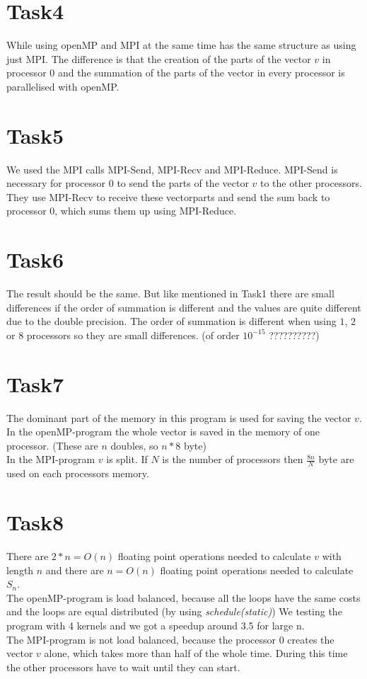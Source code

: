 \documentclass[11pt,titlepage] {article}
\begin{document}
\section{Task4}
While using openMP and MPI at the same time has the same structure as using just MPI. The difference is that the creation of the parts of the vector $v$ in processor $0$ and the summation of the parts of the vector in every processor is parallelised with openMP.

\section{Task5}
We used the MPI calls MPI-Send, MPI-Recv and MPI-Reduce.
MPI-Send is necessary for processor $0$ to send the parts of the vector $v$ to the other processors. They use MPI-Recv to receive these vectorparts and send the sum back to processor $0$, which sums them up using MPI-Reduce.

\section{Task6}
The result should be the same. But like mentioned in Task1 there are small differences if the order of summation is different and the values are quite different due to the double precision. The order of summation is different when using $1$, $2$ or $8$ processors so they are small differences. (of order  $10^{-15}$   ??????????)

\section{Task7}
The dominant part of the memory in this program is used for saving the vector $v$. In the openMP-program the whole vector is saved in the memory of one processor. (These are $n$ doubles, so $n*8$ byte)\\
In the MPI-program $v$ is split. If $N$ is the number of processors then $\frac{8n}{N}$ byte are used on each processors memory.

\section{Task8}
There are $2*n=O(n)$ floating point operations needed to calculate $v$ with length $n$ and there are $n=O(n)$ floating point operations needed to calculate $S_n$.\\
The openMP-program is load balanced, because all the loops have the same costs and the loops are equal distributed (by using \textit{schedule(static)}) We testing the program with 4 kernels and we got a speedup around 3.5 for large n.\\
The MPI-program is not load balanced, because the processor $0$ creates the vector $v$ alone, which takes more than half of the whole time. During this time the other processors have to wait until they can start. 
\end{document}
